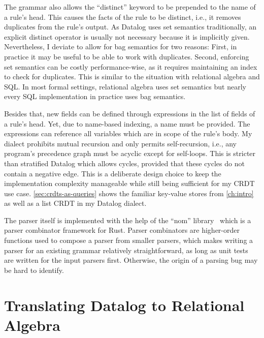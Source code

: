 The grammar also allows the ``distinct'' keyword to be prepended to the name
of a rule's head.
This causes the facts of the rule to be distinct, i.e., it removes duplicates
from the rule's output.
As Datalog uses set semantics traditionally, an explicit distinct operator
is usually not necessary because it is implicitly given.
Nevertheless, I deviate to allow for bag semantics for two reasons:
First, in practice it may be useful to be able to work with duplicates.
Second, enforcing set semantics can be costly performance-wise,
as it requires maintaining an index to check for duplicates.
This is similar to the situation with relational algebra and SQL.
In most formal settings, relational algebra uses set semantics but nearly
every SQL implementation in practice uses bag semantics.

Besides that, new fields can be defined through expressions in the list of fields
of a rule's head.
Yet, due to name-based indexing, a name must be provided.
The expressions can reference all variables which are in scope of the rule's body.
My dialect prohibits mutual recursion and only permits self-recursion, i.e.,
any program's precedence graph must be acyclic except for self-loops.
This is stricter than stratified Datalog which allows cycles,
provided that these cycles do not contain a negative edge.
This is a deliberate design choice to keep the implementation complexity manageable
while still being sufficient for my \ac{CRDT} use case.
\ref{sec:crdts-as-queries} shows the familiar key-value stores from \ref{ch:intro}
as well as a list \ac{CRDT} in my Datalog dialect.

The parser itself is implemented with the help of the ``nom'' library~\cite{nom}
which is a parser combinator framework for Rust.
Parser combinators are higher-order functions used to compose a parser
from smaller parsers, which makes writing a parser for an existing grammar
relatively straightforward, as long as unit tests are written for the input
parsers first. Otherwise, the origin of a parsing bug may be hard to identify.

\section{Translating Datalog to Relational Algebra}\label{sec:datalog-to-relational-algebra}

